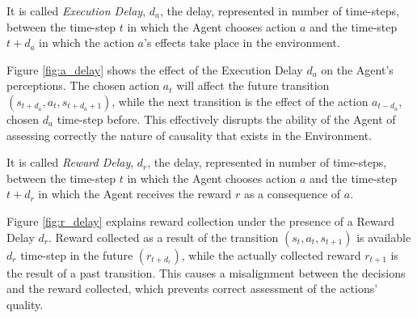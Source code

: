             \begin{definition}
                \label{def:execdelay}
                It is called \textit{Execution Delay}, $d_a$, the delay, represented in number of time-steps, between the time-step $t$ in which the Agent chooses action $a$ and the time-step $t+d_a$ in which the action $a$'s effects take place in the environment.
            \end{definition}
            \noindent
            Figure \ref{fig:a_delay} shows the effect of the Execution Delay $d_a$ on the Agent's perceptions. The chosen action $a_t$ will affect the future transition $(s_{t+d_{a}}, a_t, s_{t+d_{a}+1})$, while the next transition is the effect of the action $a_{t-d_{a}}$, chosen $d_a$ time-step before. This effectively disrupts the ability of the Agent of assessing correctly the nature of causality that exists in the Environment. 
            
            \begin{definition}
                \label{def:rewdelay}
                It is called \textit{Reward Delay}, $d_r$, the delay, represented in number of time-steps, between the time-step $t$ in which the Agent chooses action $a$ and the time-step $t+d_r$ in which the Agent receives the reward $r$ as a consequence of $a$.
            \end{definition}
            \noindent
            Figure \ref{fig:r_delay} explains reward collection under the presence of a Reward Delay $d_r$. Reward collected as a result of the transition $(s_t, a_t, s_{t+1})$ is available $d_r$ time-step in the future $(r_{t+d_{r}})$, while the actually collected reward $r_{t+1}$ is the result of a past transition. This causes a misalignment between the decisions and the reward collected, which prevents correct assessment of the actions' quality.
            

